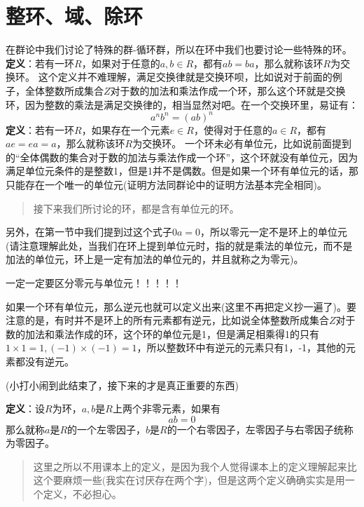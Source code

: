 \documentclass[12pt, a4paper, oneside]{ctexart}
\newenvironment{myquote}{\begin{quote}\small\color{gray}}{\end{quote}}
\begin{document}
\section{整环、域、除环}

在群论中我们讨论了特殊的群-循环群，所以在环中我们也要讨论一些特殊的环。
\textbf{定义}：若有一环$R$，如果对于任意的$a,b\in R$，都有$ab=ba$，那么就称该环$R$为交换环。
这个定义并不难理解，满足交换律就是交换环呗，比如说对于前面的例子，全体整数所成集合$Z$对于数的加法和乘法作成一个环，那么这个环就是交换环，因为整数的乘法是满足交换律的，相当显然对吧。在一个交换环里，易证有：
\[
a^nb^n=(ab)^n
\]
\textbf{定义}：若有一环$R$，如果存在一个元素$e\in R$，使得对于任意的$a\in R$，都有$ae=ea=a$，那么就称该环$R$为交换环。
一个环未必有单位元，比如说前面提到的“全体偶数的集合对于数的加法与乘法作成一个环”，这个环就没有单位元，因为满足单位元条件的是整数1，但是1并不是偶数。但是如果一个环有单位元的话，那只能存在一个唯一的单位元(证明方法同群论中的证明方法基本完全相同)。

\begin{myquote}
接下来我们所讨论的环，都是含有单位元的环。
\end{myquote}

另外，在第一节中我们提到过这个式子$0a=0$，所以零元一定不是环上的单位元(请注意理解此处，当我们在环上提到单位元时，指的就是乘法的单位元，而不是加法的单位元，环上是一定有加法的单位元的，并且就称之为零元)。

一定一定要区分零元与单位元！！！！！

如果一个环有单位元，那么逆元也就可以定义出来(这里不再把定义抄一遍了)。要注意的是，有时并不是环上的所有元素都有逆元，比如说全体整数所成集合$Z$对于数的加法和乘法作成的环，这个环的单位元是1，但是满足相乘得1的只有$1\times1=1,(-1)\times(-1)=1$，所以整数环中有逆元的元素只有1，-1，其他的元素都没有逆元。

(小打小闹到此结束了，接下来的才是真正重要的东西)

\textbf{定义}：设$R$为环，$a,b$是$R$上两个非零元素，如果有
\[
ab=0
\]
那么就称$a$是$R$的一个左零因子，$b$是$R$的一个右零因子，左零因子与右零因子统称为零因子。

\begin{myquote}
这里之所以不用课本上的定义，是因为我个人觉得课本上的定义理解起来比这个要麻烦一些(我实在讨厌存在两个字)，但是这两个定义确确实实是用一个定义，不必担心。
\end{myquote}
\end{document}
